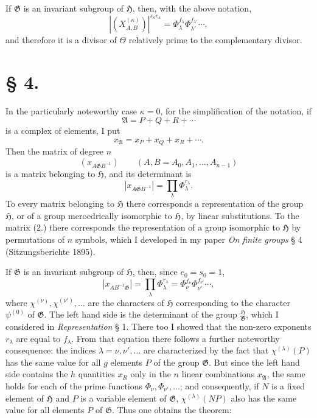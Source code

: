 \documentclass[11pt]{article}
\newcommand{\Hgr}{\mathfrak{H}}
\newcommand{\Ggr}{\mathfrak{G}}
\begin{document}
If $\Ggr$ is an invariant subgroup of $\Hgr$, then, with the above notation,
\[
\tag{8.}
  |(X^{(\kappa)}_{A,B})|^{s_\kappa e_\kappa}
  =
  \Phi_\lambda^{f_\lambda}\Phi_{\lambda'}^{f_{\lambda'}}\cdots,
\]
and therefore it is a divisor of $\Theta$ relatively prime to the complementary divisor.

\section*{§ 4.}

In the particularly noteworthy case $\kappa=0$, for the simplification of the notation, if
\[
  \mathfrak A=P+Q+R+\cdots
\]
is a complex of elements, I put
\[
\tag{1.}
  x_{\mathfrak A}=x_P+x_Q+x_R+\cdots.
\]
Then the matrix of degree $n$
\[
\tag{2.}
  (x_{A\Ggr B^{-1}})\qquad(A,B=A_0,A_1,\ldots,A_{n-1})
\]
is a matrix belonging to $\Hgr$, and its determinant is
\[
\tag{3.}
  |x_{A\Ggr B^{-1}}|=\prod_\lambda \Phi_\lambda^{r_\lambda}.
\]
To every matrix belonging to $\Hgr$ there corresponds a representation of the group $\Hgr$, or of a group meroedrically isomorphic to $\Hgr$, by linear substitutions. To the matrix (2.) there corresponds the representation of a group isomorphic to $\Hgr$ by permutations of $n$ symbols, which I developed in my paper \emph{On finite groups} § 4 (Sitzungsberichte 1895).

If $\Ggr$ is an invariant subgroup of $\Hgr$, then, since $e_0=s_0=1$,
\[
\tag{4.}
  |x_{AB^{-1}\Ggr}|=\prod_\lambda\Phi_\lambda^{r_\lambda}
  =
  \Phi_\nu^{f_\nu}\Phi_{\nu'}^{f_{\nu'}}\cdots,
\]
where $\chi^{(\nu)},\chi^{(\nu')},\ldots$ are the characters of $\Hgr$ corresponding to the character $\psi^{(0)}$ of $\Ggr$. The left hand side is the determinant of the group $\frac{\Hgr}{\Ggr}$, which I considered in \emph{Representation} § 1. There too I showed that the non-zero exponents $r_\lambda$ are equal to $f_\lambda$. From that equation there follows a further noteworthy consequence: the indices $\lambda=\nu,\nu',\ldots$ are characterized by the fact that $\chi^{(\lambda)}(P)$ has the same value for all $g$ elements $P$ of the group $\Ggr$. But since the left hand side contains the $h$ quantities $x_R$ only in the $n$ linear combinations $x_{\mathfrak A}$, the same holds for each of the prime functions $\Phi_\nu,\Phi_{\nu'},\ldots$; and consequently, if $N$ is a fixed element of $\Hgr$ and $P$ is a variable element of $\Ggr$, $\chi^{(\lambda)}(NP)$ also has the same value for all elements $P$ of $\Ggr$. Thus one obtains the theorem:
\end{document}
